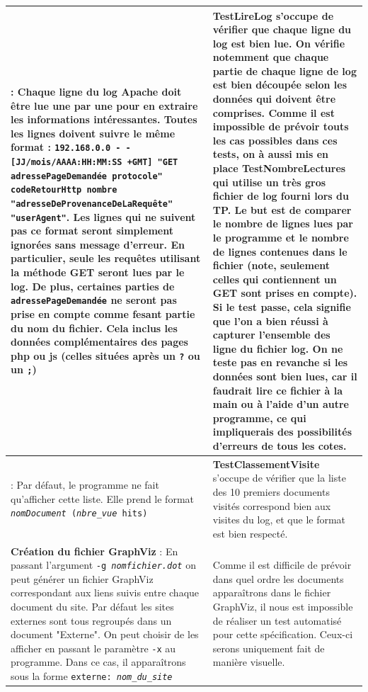 \documentclass[11pt]{article}
\begin{document}
\begin{tabularx}{\linewidth}{|>{\setlength{\hsize}{.5\hsize}\raggedright\arraybackslash}X|>{\setlength{\hsize}{.5\hsize}\raggedright\arraybackslash}X|}
 {\bf Lecture d'une ligne de log} : Chaque ligne du log Apache doit être lue une par une pour en extraire les informations intéressantes. Toutes les lignes doivent suivre le même format : \texttt{192.168.0.0 - - [JJ/mois/AAAA:HH:MM:SS +GMT] "GET adressePageDemandée protocole" codeRetourHttp nombre "adresseDeProvenanceDeLaRequête" "userAgent"}. Les lignes qui ne suivent pas ce format seront simplement ignorées sans message d'erreur. En particulier, seule les requêtes utilisant la méthode GET seront lues par le log. De plus, certaines parties de \texttt{adressePageDemandée} ne seront pas prise en compte comme fesant partie du nom du fichier. Cela inclus les données complémentaires des pages php ou js (celles situées après un \texttt{?} ou un \texttt{;}) & {\bf TestLireLog} s'occupe de vérifier que chaque ligne du log est bien lue. On vérifie notemment que chaque partie de chaque ligne de log est bien découpée selon les données qui doivent être comprises. \newline
 Comme il est impossible de prévoir touts les cas possibles dans ces tests, on à aussi mis en place {\bf TestNombreLectures} qui utilise un très gros fichier de log fourni lors du TP. Le but est de comparer le nombre de lignes lues par le programme et le nombre de lignes contenues dans le fichier (note, seulement celles qui contiennent un GET sont prises en compte). Si le test passe, cela signifie que l'on a bien réussi à capturer l'ensemble des ligne du fichier log.
 On ne teste pas en revanche si les données sont bien lues, car il faudrait lire ce fichier à la main ou à l'aide d'un autre programme, ce qui impliquerais des possibilités d'erreurs de tous les cotes.
 \\ \hline
 {\bf Affichage des 10 documents les plus consultés} : Par défaut, le programme ne fait qu'afficher cette liste. Elle prend le format \texttt{\emph{nomDocument} (\emph{nbre\_vue} hits)} & \textbf{TestClassementVisite} s'occupe de vérifier que la liste des 10 premiers documents visités correspond bien aux visites du log, et que le format est bien respecté. \\
 \hline
 {\bf Création du fichier GraphViz} : En passant l'argument \texttt{-g \emph{nomfichier.dot}} on peut générer un fichier GraphViz correspondant aux liens suivis entre chaque document du site. Par défaut les sites externes sont tous regroupés dans un document "Externe". On peut choisir de les afficher en passant le paramètre \texttt{-x} au programme. Dans ce cas, il apparaîtrons sous la forme \texttt{externe: \emph{nom\_du\_site}} & Comme il est difficile de prévoir dans quel ordre les documents apparaîtrons dans le fichier GraphViz, il nous est impossible de réaliser un test automatisé pour cette spécification. Ceux-ci serons uniquement fait de manière visuelle.\\

\end{tabularx}
\end{document}
